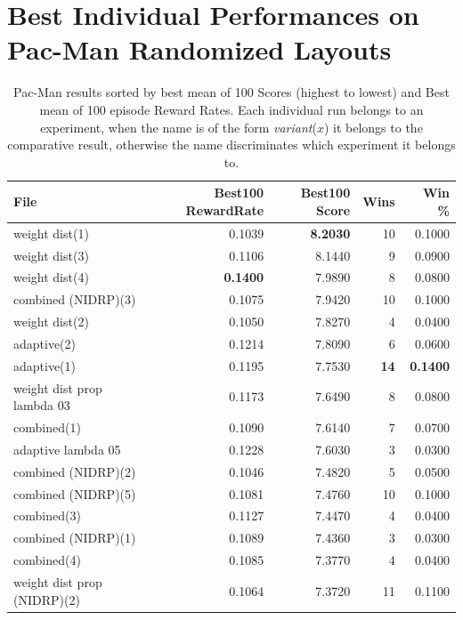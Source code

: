 \section{Best Individual Performances on Pac-Man Randomized Layouts}

\begin{table}[H]
\caption{Pac-Man results sorted by best mean of 100 Scores (highest to lowest) and Best mean of 100 episode Reward Rates. Each individual run belongs to an experiment, when the name is of the form \emph{variant}($x$) it belongs to the comparative result, otherwise the name discriminates which experiment it belongs to.}
\label{tab:pacman-best100-score}
\begin{tabular}{l r r r r}
\hline
File & Best100 RewardRate & Best100 Score & Wins & Win \% \\
\hline
weight dist(1)                    & 0.1039 & \textbf{8.2030} & 10 & 0.1000 \\
weight dist(3)                    & 0.1106 & 8.1440 & 9  & 0.0900 \\
weight dist(4)                    & \textbf{0.1400} & 7.9890 & 8  & 0.0800 \\
combined (NIDRP)(3)               & 0.1075 & 7.9420 & 10 & 0.1000 \\
weight dist(2)                    & 0.1050 & 7.8270 & 4  & 0.0400 \\
adaptive(2)                       & 0.1214 & 7.8090 & 6  & 0.0600 \\
adaptive(1)                       & 0.1195 & 7.7530 & \textbf{14} & \textbf{0.1400} \\
weight dist prop lambda 03        & 0.1173 & 7.6490 & 8  & 0.0800 \\
combined(1)                       & 0.1090 & 7.6140 & 7  & 0.0700 \\
adaptive lambda 05                & 0.1228 & 7.6030 & 3  & 0.0300 \\
combined (NIDRP)(2)               & 0.1046 & 7.4820 & 5  & 0.0500 \\
combined (NIDRP)(5)               & 0.1081 & 7.4760 & 10 & 0.1000 \\
combined(3)                       & 0.1127 & 7.4470 & 4  & 0.0400 \\
combined (NIDRP)(1)               & 0.1089 & 7.4360 & 3  & 0.0300 \\
combined(4)                       & 0.1085 & 7.3770 & 4  & 0.0400 \\
weight dist prop (NIDRP)(2)       & 0.1064 & 7.3720 & 11 & 0.1100 \\

\end{tabular}
\end{table}
